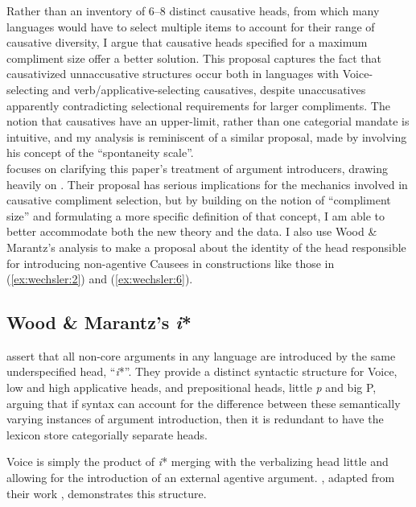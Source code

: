 \documentclass[output=paper,modfonts,nonflat,colorlinks,citecolor=brown]{langsci/langscibook}
\begin{document}
Rather than an inventory of 6--8 distinct causative heads, from which many languages would have to select multiple items to account for their range of causative diversity, I argue that causative heads specified for a maximum compliment size offer a better solution. This proposal captures the fact that causativized unnaccusative structures occur both in languages with Voice-selecting and verb/applicative-selecting causatives, despite unaccusatives apparently contradicting selectional requirements for larger compliments. The notion that causatives have an upper-limit, rather than one categorial mandate is intuitive, and my analysis is reminiscent of a similar proposal, made by \citet{Haspelmath2016} involving his concept of the “spontaneity scale”. \\

 focuses on clarifying this paper’s treatment of argument introducers, drawing heavily on \citet{WoodMarantz2017}. Their proposal has serious implications for the mechanics involved in causative compliment selection, but by building on the notion of “compliment size” and formulating a more specific definition of that concept, I am able to better accommodate both the new theory and the data. I also use Wood \& Marantz’s analysis to make a proposal about the identity of the head responsible for introducing non-agentive Causees in constructions like those in (\ref{ex:wechsler:2}) and (\ref{ex:wechsler:6}).

\subsection{Wood \& Marantz’s \textit{i}*}\label{sec:wechsler:2.2}

\citet{WoodMarantz2017} assert that all non-core arguments in any language are introduced by the same underspecified head, “\textit{i}*”. They provide a distinct syntactic structure for Voice, low and high applicative heads, and prepositional heads, little \textit{p} and big P, arguing that if syntax can account for the difference between these semantically varying instances of argument introduction, then it is redundant to have the lexicon store categorially separate heads.

Voice is simply the product of \textit{i}* merging with the verbalizing head little \liv and allowing for the introduction of an external agentive argument. , adapted from their work \citeyearpar[261]{WoodMarantz2017}, demonstrates this structure.
\end{document}
